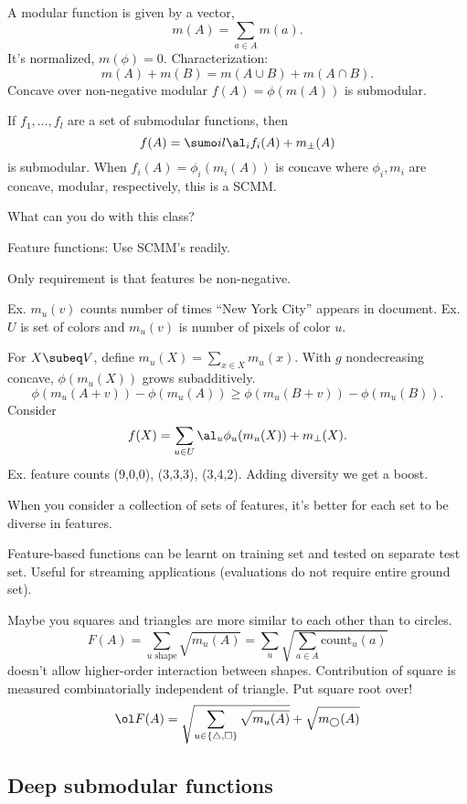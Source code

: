 A modular function is given by a vector,
$$
m(A) = \sum_{a\in A} m(a).
$$
It's normalized, $m(\phi)=0$. Characterization:
$$
m(A) + m(B) = m(A\cup B) + m(A\cap B).
$$
Concave over non-negative modular $f(A) = \phi(m(A))$ is submodular.

If $f_1,\ldots, f_l$ are a set of submodular functions, then 
$$
f(A) = \sumo il \al_i f_i(A) + m_\pm (A)
$$
is submodular. When $f_i(A) = \phi_i(m_i(A))$ is concave where $\phi_i,m_i$ are concave, modular, respectively, this is a SCMM.

What can you do with this class?

Feature functions: Use SCMM's readily. %

Only requirement is that features be non-negative.

Ex. $m_u(v)$ counts number of times ``New York City'' appears in document.  Ex. $U$ is set of colors and $m_u(v)$ is number of pixels of color $u$.


For $X\subeq V$, define $m_u(X) = \sum_{x\in X}m_u(x)$. With $g$ nondecreasing concave, $\phi(m_u(X))$ grows subadditively.
$$
\phi(m_u(A+v)) - \phi(m_u(A)) \ge \phi(m_u(B+v)) - \phi(m_u(B)). 
$$
Consider
$$
f(X) = \sum_{u\in U}\al_u\phi_u(m_u(X)) + m_\perp(X).
$$
Ex. feature counts (9,0,0), (3,3,3), (3,4,2). Adding diversity we get a boost.

When you consider a collection of sets of features, it's better for each set to be diverse in features.

Feature-based functions can be learnt on training set and tested on separate test set. Useful for streaming applications (evaluations do not require entire ground set).

Maybe you squares and triangles are more similar to each other than to circles. $$F(A) = \sum_{u\text{ shape}} \sqrt{m_u(A)} = \sum_u \sqrt{\sum_{a\in A} \text{count}_u(a)}$$
doesn't allow higher-order interaction between shapes. Contribution of square is measured combinatorially independent of triangle.
Put square root over!
$$
\ol F(A) = \sqrt{\sum_{u\in \{\triangle, \square\}} \sqrt{m_u(A)}} + \sqrt{m_{\bigcirc}(A)}
$$
\subsection{Deep submodular functions}

